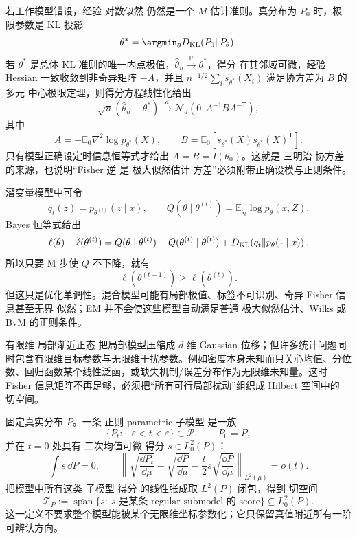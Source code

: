 \begin{theorem}
若工作模型错设，经验 对数似然 仍然是一个 $M$-估计准则。真分布为 $P_0$ 时，极限参数是 KL 投影
\[
 \theta^*=\argmin_\theta
 D_{\rm KL}(P_0\Vert P_\theta).
\]
若 $\theta^*$ 是总体 KL 准则的唯一内点极值，$\widehat\theta_n\xrightarrow{\mathbb P}\theta^*$，得分 在其邻域可微，经验 Hessian 一致收敛到非奇异矩阵 $-A$，并且 $n^{-1/2}\sum_i s_{\theta^*}(X_i)$ 满足协方差为 $B$ 的多元 中心极限定理，则得分方程线性化给出
\[
 \sqrt n(\widehat\theta_n-\theta^*)
 \xrightarrow{d}\mathcal N_d(0,A^{-1}BA^{-\mathsf T}),
\]
其中
\[
 A=-\mathbb E_0\nabla^2\log p_{\theta^*}(X),
 \qquad
 B=\mathbb E_0[s_{\theta^*}(X)s_{\theta^*}(X)^{\mathsf T}].
\]
只有模型正确设定时信息恒等式才给出 $A=B=I(\theta_0)$。这就是 三明治 协方差的来源，也说明“Fisher 逆 是 极大似然估计 方差”必须附带正确设模与正则条件。
\end{theorem}

\begin{note}
潜变量模型中可令
\[
 q_t(z)=p_{\theta^{(t)}}(z\mid x),
 \qquad
 Q(\theta\mid\theta^{(t)})
 =\mathbb E_{q_t}\log p_\theta(x,Z).
\]
Bayes 恒等式给出
\begin{equation*}\ell(\theta)-\ell(\theta^{(t)})
 =Q(\theta\mid\theta^{(t)})-Q(\theta^{(t)}\mid\theta^{(t)})
 +D_{\rm KL}\!\left(q_t\Vert p_\theta(\,\cdot\mid x)\right).
\end{equation*}
所以只要 M 步使 $Q$ 不下降，就有
\begin{equation*}\ell(\theta^{(t+1)})\ge\ell(\theta^{(t)}).
\end{equation*}
但这只是优化单调性。混合模型可能有局部极值、标签不可识别、奇异 Fisher 信息甚至无界 似然；EM 并不会使这些模型自动满足普通 极大似然估计、Wilks 或 BvM 的正则条件。
\end{note}

有限维 局部渐近正态 把局部模型压缩成 $d$ 维 Gaussian 位移；但许多统计问题同时包含有限维目标参数与无限维干扰参数。例如密度本身未知而只关心均值、分位数、回归函数某个线性泛函，或缺失机制/误差分布作为无限维未知量。这时 Fisher 信息矩阵不再足够，必须把``所有可行局部扰动''组织成 Hilbert 空间中的 切空间。

\begin{definition}[正则子模型与闭切空间]
固定真实分布 $P$。一条 正则 parametric 子模型 是一族
\[
\{P_t:-\varepsilon<t<\varepsilon\}
\subset\mathcal P,
\qquad P_0=P,
\]
并在 $t=0$ 处具有 二次均值可微 得分 $s\in L_0^2(P)$：
\[
\int s\,\dd P=0,
\qquad
\left\|
\sqrt{\frac{\dd P_t}{\dd\mu}}
-
\sqrt{\frac{\dd P}{\dd\mu}}
-
\frac t2 s\sqrt{\frac{\dd P}{\dd\mu}}
\right\|_{L^2(\mu)}
=o(t).
\]
把模型中所有这类 子模型 得分 的线性张成取 $L^2(P)$ 闭包，得到 切空间
\begin{equation*}\boxed{
\mathcal T_P
:=\overline{\operatorname{span}}
\{s:\ s\text{ 是某条 regular submodel 的 score}\}
\subseteq L_0^2(P).
}\end{equation*}
这一定义不要求整个模型能被某个无限维坐标参数化；它只保留真值附近所有一阶可辨认方向。
\end{definition}


